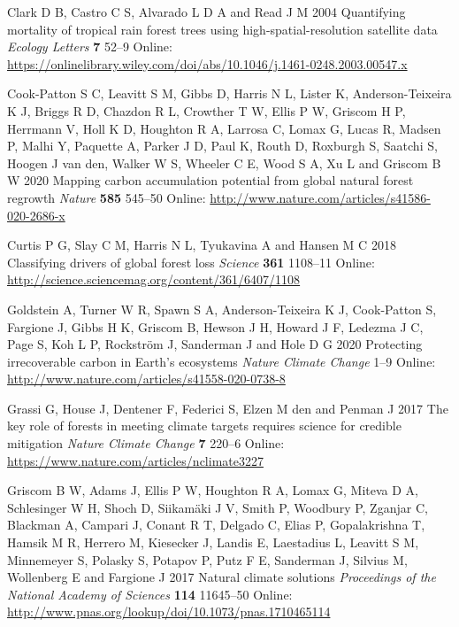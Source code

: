 \documentclass[
]{article}
\begin{document}
\leavevmode\hypertarget{ref-clark_quantifying_2004}{}%
Clark D B, Castro C S, Alvarado L D A and Read J M 2004 Quantifying
mortality of tropical rain forest trees using high-spatial-resolution
satellite data \emph{Ecology Letters} \textbf{7} 52--9 Online:
\url{https://onlinelibrary.wiley.com/doi/abs/10.1046/j.1461-0248.2003.00547.x}

\leavevmode\hypertarget{ref-cook-patton_mapping_2020}{}%
Cook-Patton S C, Leavitt S M, Gibbs D, Harris N L, Lister K,
Anderson-Teixeira K J, Briggs R D, Chazdon R L, Crowther T W, Ellis P W,
Griscom H P, Herrmann V, Holl K D, Houghton R A, Larrosa C, Lomax G,
Lucas R, Madsen P, Malhi Y, Paquette A, Parker J D, Paul K, Routh D,
Roxburgh S, Saatchi S, Hoogen J van den, Walker W S, Wheeler C E, Wood S
A, Xu L and Griscom B W 2020 Mapping carbon accumulation potential from
global natural forest regrowth \emph{Nature} \textbf{585} 545--50
Online: \url{http://www.nature.com/articles/s41586-020-2686-x}

\leavevmode\hypertarget{ref-curtis_classifying_2018}{}%
Curtis P G, Slay C M, Harris N L, Tyukavina A and Hansen M C 2018
Classifying drivers of global forest loss \emph{Science} \textbf{361}
1108--11 Online:
\url{http://science.sciencemag.org/content/361/6407/1108}

\leavevmode\hypertarget{ref-goldstein_protecting_2020}{}%
Goldstein A, Turner W R, Spawn S A, Anderson-Teixeira K J, Cook-Patton
S, Fargione J, Gibbs H K, Griscom B, Hewson J H, Howard J F, Ledezma J
C, Page S, Koh L P, Rockström J, Sanderman J and Hole D G 2020
Protecting irrecoverable carbon in Earth's ecosystems \emph{Nature
Climate Change} 1--9 Online:
\url{http://www.nature.com/articles/s41558-020-0738-8}

\leavevmode\hypertarget{ref-grassi_key_2017}{}%
Grassi G, House J, Dentener F, Federici S, Elzen M den and Penman J 2017
The key role of forests in meeting climate targets requires science for
credible mitigation \emph{Nature Climate Change} \textbf{7} 220--6
Online: \url{https://www.nature.com/articles/nclimate3227}

\leavevmode\hypertarget{ref-griscom_natural_2017}{}%
Griscom B W, Adams J, Ellis P W, Houghton R A, Lomax G, Miteva D A,
Schlesinger W H, Shoch D, Siikamäki J V, Smith P, Woodbury P, Zganjar C,
Blackman A, Campari J, Conant R T, Delgado C, Elias P, Gopalakrishna T,
Hamsik M R, Herrero M, Kiesecker J, Landis E, Laestadius L, Leavitt S M,
Minnemeyer S, Polasky S, Potapov P, Putz F E, Sanderman J, Silvius M,
Wollenberg E and Fargione J 2017 Natural climate solutions
\emph{Proceedings of the National Academy of Sciences} \textbf{114}
11645--50 Online:
\url{http://www.pnas.org/lookup/doi/10.1073/pnas.1710465114}
\end{document}
